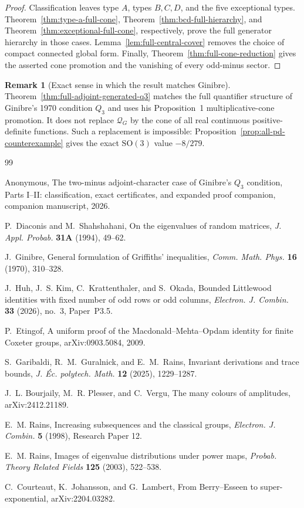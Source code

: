 \documentclass[11pt,reqno]{amsart}
\theoremstyle{plain}
\theoremstyle{definition}
\newtheorem{remark}[theorem]{Remark}
\newcommand{\Qcone}{\mathcal Q}
\begin{document}
\begin{proof}
Classification leaves type $A$, types $B,C,D$, and the five exceptional
types.  Theorem~\ref{thm:type-a-full-cone},
Theorem~\ref{thm:bcd-full-hierarchy}, and
Theorem~\ref{thm:exceptional-full-cone}, respectively, prove the full
generator hierarchy in those cases.  Lemma~\ref{lem:full-central-cover}
removes the choice of compact connected global form.  Finally,
Theorem~\ref{thm:full-cone-reduction} gives the asserted cone promotion and
the vanishing of every odd-minus sector.
\end{proof}

\begin{remark}[Exact sense in which the result matches Ginibre]
Theorem~\ref{thm:full-adjoint-generated-q3} matches the full quantifier
structure of Ginibre's 1970 condition $Q_3$ and uses his Proposition~1
multiplicative-cone promotion.  It does not replace $\Qcone_G$ by the cone of
all real continuous positive-definite functions.  Such a replacement is
impossible: Proposition~\ref{prop:all-pd-counterexample} gives the exact
$\mathrm{SO}(3)$ value $-8/279$.
\end{remark}

\begin{thebibliography}{99}

Anonymous,
The two-minus adjoint-character case of Ginibre's $Q_3$ condition,
Parts I--II: classification, exact certificates, and expanded proof
companion, companion manuscript, 2026.

P.~Diaconis and M.~Shahshahani,
On the eigenvalues of random matrices,
\emph{J. Appl. Probab.} \textbf{31A} (1994), 49--62.

J.~Ginibre,
General formulation of Griffiths' inequalities,
\emph{Comm. Math. Phys.} \textbf{16} (1970), 310--328.

J.~Huh, J.~S. Kim, C.~Krattenthaler, and S.~Okada,
Bounded Littlewood identities with fixed number of odd rows or odd columns,
\emph{Electron. J. Combin.} \textbf{33} (2026), no.~3, Paper~P3.5.

P.~Etingof,
A uniform proof of the Macdonald--Mehta--Opdam identity for finite Coxeter
groups,
arXiv:0903.5084, 2009.

S.~Garibaldi, R.~M.~Guralnick, and E.~M.~Rains,
Invariant derivations and trace bounds,
\emph{J. \'{E}c. polytech. Math.} \textbf{12} (2025), 1229--1287.

J.~L. Bourjaily, M.~R. Plesser, and C.~Vergu,
The many colours of amplitudes,
arXiv:2412.21189.

E.~M. Rains,
Increasing subsequences and the classical groups,
\emph{Electron. J. Combin.} \textbf{5} (1998), Research Paper 12.

E.~M. Rains,
Images of eigenvalue distributions under power maps,
\emph{Probab. Theory Related Fields} \textbf{125} (2003), 522--538.

C.~Courteaut, K.~Johansson, and G.~Lambert,
From Berry--Esseen to super-exponential,
arXiv:2204.03282.

\end{thebibliography}
\end{document}
